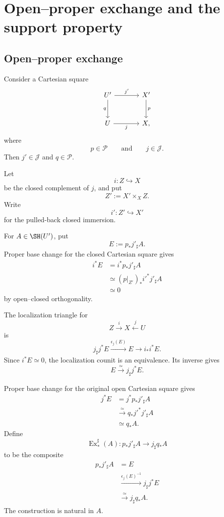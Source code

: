 \section{Open--proper exchange and the support property}
\label{sec:proper-excision}

\subsection{Open--proper exchange}

Consider a Cartesian square
\[
\begin{tikzcd}[column sep=large,row sep=large]
    U' \arrow[r,"j'"] \arrow[d,"q"']
        & X' \arrow[d,"p"] \\
    U \arrow[r,"j"']
        & X,
\end{tikzcd}
\]
where
\[
    p\in\mathcal P
    \qquad\text{and}\qquad
    j\in\mathcal J.
\]
Then \(j'\in\mathcal J\) and \(q\in\mathcal P\).

\begin{construction}
\label{constr:open-proper-exchange}
Let
\[
    i:Z\hookrightarrow X
\]
be the closed complement of \(j\), and put
\[
    Z':=X'\times_XZ.
\]
Write
\[
    i':Z'\hookrightarrow X'
\]
for the pulled-back closed immersion.

For \(A\in\SH(U')\), put
\[
    E:=p_*j'_\sharp A.
\]
Proper base change for the closed Cartesian square gives
\[
\begin{aligned}
    i^*E
    &=
    i^*p_*j'_\sharp A \\
    &\simeq
    (p|_{Z'})_*i'^*j'_\sharp A \\
    &\simeq
    0
\end{aligned}
\]
by open--closed orthogonality.

The localization triangle for
\[
    Z\xrightarrow{i}X\xleftarrow{j}U
\]
is
\[
    j_\sharp j^*E
    \xrightarrow{\epsilon_j(E)}
    E
    \longrightarrow
    i_*i^*E.
\]
Since \(i^*E\simeq0\), the localization counit is an equivalence.  Its
inverse gives
\[
    E
    \xrightarrow{\simeq}
    j_\sharp j^*E.
\]

Proper base change for the original open Cartesian square gives
\[
\begin{aligned}
    j^*E
    &=
    j^*p_*j'_\sharp A \\
    &\xrightarrow{\simeq}
    q_*j'^*j'_\sharp A \\
    &\simeq
    q_*A.
\end{aligned}
\]
Define
\[
    \operatorname{Ex}^{\sharp}_{*}(A):
    p_*j'_\sharp A
    \longrightarrow
    j_\sharp q_*A
\]
to be the composite
\[
\begin{aligned}
    p_*j'_\sharp A
    &=E \\
    &\xrightarrow{\epsilon_j(E)^{-1}}
    j_\sharp j^*E \\
    &\xrightarrow{\simeq}
    j_\sharp q_*A.
\end{aligned}
\]
The construction is natural in \(A\).
\end{construction}

